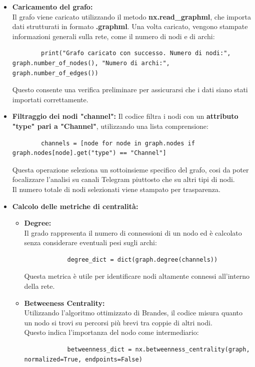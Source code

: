 \documentclass[12pt]{article}
\begin{document}
		\begin{itemize}[label=] 
		\item \textbf{Caricamento del grafo:}\\
		Il grafo viene caricato utilizzando il metodo \textbf{nx.read\_graphml}, che importa dati strutturati in formato \textbf{.graphml}. Una volta caricato, vengono stampate informazioni generali sulla rete, come il numero di nodi e di archi:
		\begin{lstlisting}
		print("Grafo caricato con successo. Numero di nodi:", graph.number_of_nodes(), "Numero di archi:", graph.number_of_edges())
		\end{lstlisting}
		Questo consente una verifica preliminare per assicurarsi che i dati siano stati importati correttamente.
		\item \textbf{Filtraggio dei nodi "channel":}
		Il codice filtra i nodi con un \textbf{attributo "type" pari a "Channel"}, utilizzando una lista comprensione:
		\begin{lstlisting}
		channels = [node for node in graph.nodes if graph.nodes[node].get("type") == "Channel"]
		\end{lstlisting}
		Questa operazione seleziona un sottoinsieme specifico del grafo, cosi da poter focalizzare l'analisi su canali Telegram piuttosto che su altri tipi di nodi. \\Il numero totale di nodi selezionati viene stampato per trasparenza.
		\item \textbf{Calcolo delle metriche di centralità:}
		\begin{itemize}
			\item \textbf{Degree:}\\
			Il grado rappresenta il numero di connessioni di un nodo ed è calcolato senza considerare eventuali pesi sugli archi:
			\begin{lstlisting}
			degree_dict = dict(graph.degree(channels))
			\end{lstlisting}
			Questa metrica è utile per identificare nodi altamente connessi all'interno della rete.
			\item \textbf{Betweeness Centrality:}\\
			Utilizzando l'algoritmo ottimizzato di Brandes, il codice misura quanto un nodo si trovi su percorsi più brevi tra coppie di altri nodi.\\ Questo indica l'importanza del nodo come intermediario:
			\begin{lstlisting}
			betweenness_dict = nx.betweenness_centrality(graph, normalized=True, endpoints=False)

\end{lstlisting}
\end{itemize}
\end{itemize}
\end{document}
